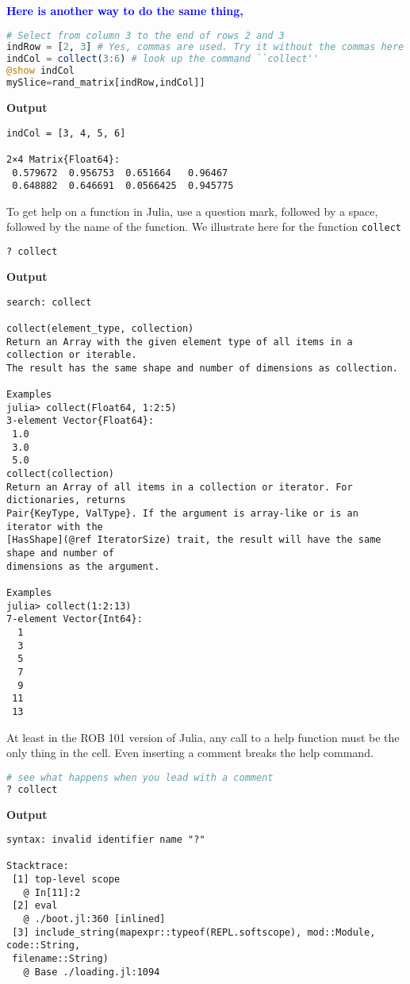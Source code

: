 \textcolor{blue}{\bf Here is another way to do the same thing,}
\begin{lstlisting}[language=Julia,style=mystyle]
# Select from column 3 to the end of rows 2 and 3
indRow = [2, 3] # Yes, commas are used. Try it without the commas here
indCol = collect(3:6) # look up the command ``collect''
@show indCol
mySlice=rand_matrix[indRow,indCol]] 
\end{lstlisting}
\textbf{Output} 
\begin{verbatim}
indCol = [3, 4, 5, 6]

2×4 Matrix{Float64}:
 0.579672  0.956753  0.651664   0.96467
 0.648882  0.646691  0.0566425  0.945775
\end{verbatim}

\begin{rem}
To get help on a function in Julia, use a question mark, followed by a space, followed by the name of the function. We illustrate here for the function \texttt{collect}
\end{rem}

\begin{lstlisting}[language=Julia,style=mystyle]
? collect
\end{lstlisting}
\textbf{Output} 
\begin{verbatim}
search: collect

collect(element_type, collection)
Return an Array with the given element type of all items in a collection or iterable. 
The result has the same shape and number of dimensions as collection.

Examples
julia> collect(Float64, 1:2:5)
3-element Vector{Float64}:
 1.0
 3.0
 5.0
collect(collection)
Return an Array of all items in a collection or iterator. For dictionaries, returns
Pair{KeyType, ValType}. If the argument is array-like or is an iterator with the
[HasShape](@ref IteratorSize) trait, the result will have the same shape and number of
dimensions as the argument.

Examples
julia> collect(1:2:13)
7-element Vector{Int64}:
  1
  3
  5
  7
  9
 11
 13
\end{verbatim}
\begin{rem}
At least in the ROB 101 version of Julia, any call to a help function must be the only thing in the cell. Even inserting a comment breaks the help command.
\end{rem}

\begin{lstlisting}[language=Julia,style=mystyle]
# see what happens when you lead with a comment
? collect
\end{lstlisting}
\textbf{Output} 
\begin{verbatim}
syntax: invalid identifier name "?"

Stacktrace:
 [1] top-level scope
   @ In[11]:2
 [2] eval
   @ ./boot.jl:360 [inlined]
 [3] include_string(mapexpr::typeof(REPL.softscope), mod::Module, code::String,
 filename::String)
   @ Base ./loading.jl:1094
\end{verbatim}



